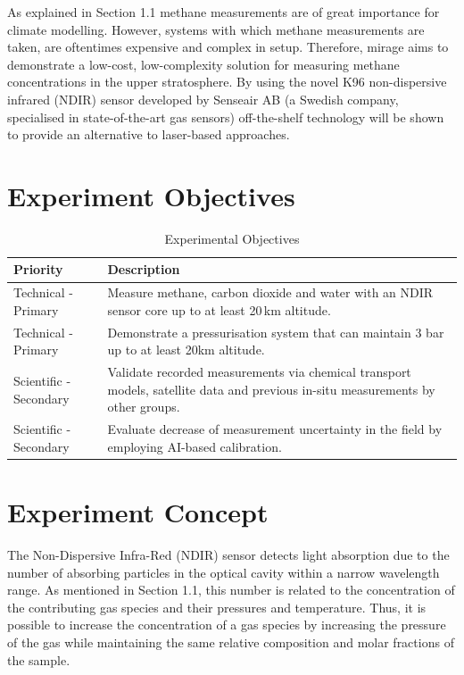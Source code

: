\documentclass[
  a4paper,
  11pt,
  openany,
  parskip,
  toc=totoc,
  listof=totoc,
  bibliography=totoc
]{scrreprt}
\begin{document}
As explained in Section 1.1 methane measurements are of great importance for climate modelling.
However, systems with which methane measurements are taken, are oftentimes expensive and complex in setup.
Therefore, \gls{mirage} aims to demonstrate a low-cost, low-complexity solution for measuring methane concentrations in the upper stratosphere.
By using the novel K96 non-dispersive infrared (NDIR) sensor developed by Senseair AB (a Swedish company, specialised in state-of-the-art gas sensors) \cite{wastine2022} off-the-shelf technology will be shown to provide an alternative to laser-based approaches.

\section{Experiment Objectives}

\begin{table}[H]
\centering
\caption{Experimental Objectives}
\label{tab:objectives}
\begin{tabularx}{0.9\textwidth}{lX}
\toprule
\textbf{Priority} & \textbf{Description} \\
\midrule
Technical - Primary & Measure methane, carbon dioxide and water with an NDIR sensor core up to at least 20\,km altitude.\\
Technical - Primary & Demonstrate a pressurisation system that can maintain 3 bar up to at least 20km altitude.\\
Scientific - Secondary & Validate recorded measurements via chemical transport models, satellite data and previous in-situ measurements by other groups.\\
Scientific - Secondary & Evaluate decrease of measurement uncertainty in the field by employing AI-based calibration.\\
\bottomrule
\end{tabularx}
\end{table}

\section{Experiment Concept}

The Non-Dispersive Infra-Red (NDIR) sensor detects light absorption due to the number of absorbing particles in the optical cavity within a narrow wavelength range.
As mentioned in Section 1.1, this number is related to the concentration of the contributing gas species and their pressures and temperature.
Thus, it is possible to increase the concentration of a gas species by increasing the pressure of the gas while maintaining the same relative composition and molar fractions of the sample.
\end{document}
